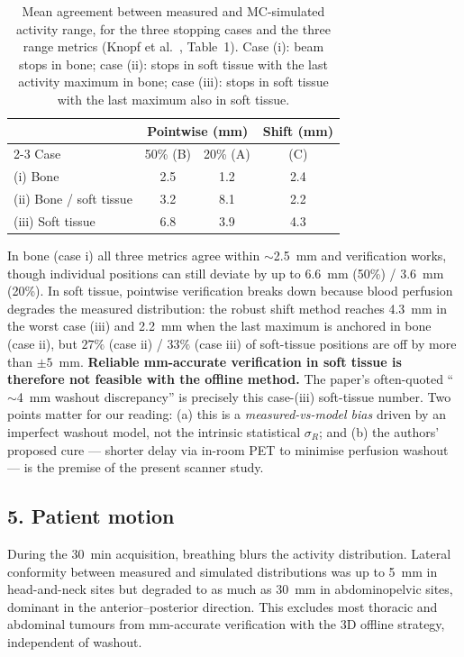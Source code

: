 \documentclass[11pt]{article}
\begin{document}
\begin{table}[h]
  \centering
  \caption{Mean agreement between measured and MC-simulated activity range,
    for the three stopping cases and the three range metrics
    (Knopf et al.~\cite{knopf2009}, Table~1). Case (i): beam stops in bone;
    case (ii): stops in soft tissue with the last activity maximum in bone;
    case (iii): stops in soft tissue with the last maximum also in soft tissue.}
  \label{tab:washout}
  \begin{tabular}{lccc}
    \toprule
    & \multicolumn{2}{c}{Pointwise (mm)} & Shift (mm) \\
    \cmidrule(lr){2-3}
    Case & 50\% (B) & 20\% (A) & (C) \\
    \midrule
    (i)   Bone                 & 2.5 & 1.2 & 2.4 \\
    (ii)  Bone / soft tissue   & 3.2 & 8.1 & 2.2 \\
    (iii) Soft tissue          & 6.8 & 3.9 & 4.3 \\
    \bottomrule
  \end{tabular}
\end{table}

\noindent
In bone (case i) all three metrics agree within $\sim$2.5~mm and verification
works, though individual positions can still deviate by up to 6.6~mm (50\%) /
3.6~mm (20\%). In soft tissue, pointwise verification breaks down because blood
perfusion degrades the measured distribution: the robust shift method reaches
4.3~mm in the worst case (iii) and 2.2~mm when the last maximum is anchored in
bone (case ii), but $27\%$ (case ii) / $33\%$ (case iii) of soft-tissue positions
are off by more than $\pm5$~mm. \textbf{Reliable mm-accurate verification in soft
tissue is therefore not feasible with the offline method.} The paper's often-quoted
``$\sim$4~mm washout discrepancy'' is precisely this case-(iii) soft-tissue number.
Two points matter for our reading: (a) this is a \emph{measured-vs-model bias}
driven by an imperfect washout model, not the intrinsic statistical $\sigma_R$;
and (b) the authors' proposed cure --- shorter delay via in-room PET to minimise
perfusion washout --- is the premise of the present scanner study.

\subsection*{5. Patient motion}

During the 30~min acquisition, breathing blurs the activity distribution. Lateral
conformity between measured and simulated distributions was up to 5~mm in
head-and-neck sites but degraded to as much as 30~mm in abdominopelvic sites,
dominant in the anterior--posterior direction. This excludes most thoracic and
abdominal tumours from mm-accurate verification with the 3D offline strategy,
independent of washout.
\end{document}
